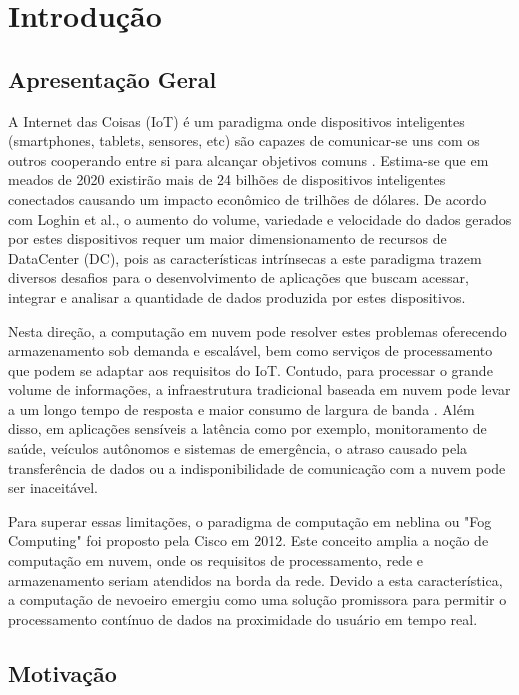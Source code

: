 \chapter{Introdução}
\section{Apresentação Geral}

A Internet das Coisas (IoT) é um paradigma onde dispositivos inteligentes (smartphones, tablets, sensores, etc) são capazes de comunicar-se uns com os outros cooperando entre si  para alcançar objetivos comuns \cite{atzori2010internet}. Estima-se que em meados de 2020 existirão mais de 24 bilhões de dispositivos inteligentes conectados causando um impacto econômico de trilhões de dólares\cite{gubbi2013internet,rivera2014gartner}. De acordo com Loghin et al.\cite{loghin2015performance}, o aumento do volume, variedade e velocidade do dados gerados por estes dispositivos requer um maior dimensionamento de recursos de DataCenter (DC), pois as características intrínsecas a este paradigma trazem diversos desafios para o desenvolvimento de aplicações que buscam acessar, integrar e analisar a quantidade de dados produzida por estes dispositivos.

Nesta direção, a computação em nuvem pode resolver estes problemas oferecendo armazenamento sob demanda e escalável, bem como serviços de processamento que podem se adaptar aos requisitos do IoT. Contudo, 
para processar o grande volume de informações, a infraestrutura tradicional baseada em nuvem pode levar a um longo tempo de resposta e maior consumo de largura de banda \cite{bonomi2014fog}. Além disso, em aplicações sensíveis a latência como por exemplo, monitoramento de saúde, veículos autônomos e sistemas de emergência, o atraso causado pela transferência de dados ou a indisponibilidade de comunicação com a nuvem pode ser inaceitável\cite{bonomi2014fog,dastjerdi2016fog}.

Para superar essas limitações, o paradigma de computação em neblina ou "Fog Computing"\cite{computing2016internet} foi proposto pela Cisco em 2012. Este conceito amplia a noção de computação em nuvem, onde os requisitos de processamento, rede e armazenamento seriam atendidos na borda da rede. Devido a esta característica, a computação de nevoeiro emergiu como uma solução promissora para permitir o processamento contínuo de dados na proximidade do usuário em tempo real.

\section{Motivação}


